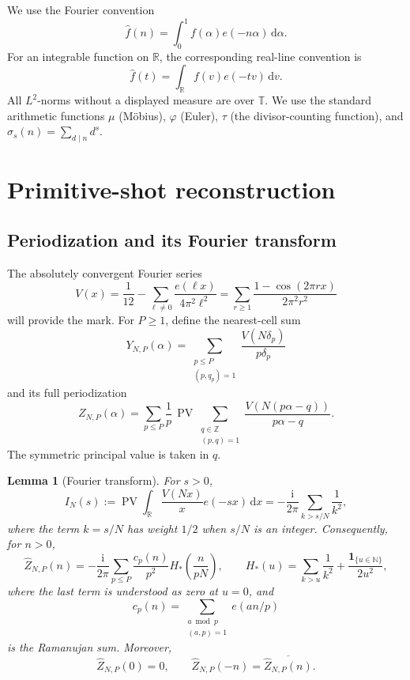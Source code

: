 \documentclass[11pt]{article}
\numberwithin{equation}{section}
\newtheorem{lemma}[theorem]{Lemma}
\theoremstyle{definition}
\newcommand{\T}{\mathbb T}
\newcommand{\R}{\mathbb R}
\newcommand{\Z}{\mathbb Z}
\newcommand{\N}{\mathbb N}
\newcommand{\1}{\mathbf 1}
\newcommand{\ii}{\mathrm i}
\newcommand{\dd}{\,\mathrm d}
\newcommand{\PV}{\operatorname{PV}}
\newcommand{\wh}{\widehat}
\begin{document}
We use the Fourier convention
\[
 \wh f(n)=\int_0^1 f(\alpha)e(-n\alpha)\dd\alpha.
\]
For an integrable function on \(\R\), the corresponding real-line
convention is
\[
 \wh f(t)=\int_{\R}f(v)e(-tv)\dd v.
\]
All \(L^2\)-norms without a displayed measure are over \(\T\).
We use the standard arithmetic functions \(\mu\) (Möbius), \(\varphi\)
(Euler), \(\tau\) (the divisor-counting function), and
\(\sigma_s(n)=\sum_{d\mid n}d^s\).

\section{Primitive-shot reconstruction}\label{sec:reconstruction}

\subsection{Periodization and its Fourier transform}

The absolutely convergent Fourier series
\begin{equation}\label{eq:Vfourier}
 V(x)=\frac1{12}-\sum_{\ell\ne0}
 \frac{e(\ell x)}{4\pi^2\ell^2}
 =\sum_{r\ge1}\frac{1-\cos(2\pi r x)}{2\pi^2r^2}
\end{equation}
will provide the mark.  For \(P\ge1\), define the nearest-cell sum
\[
 Y_{N,P}(\alpha)=
 \sum_{\substack{p\le P\\(p,q_p)=1}}
 \frac{V(N\delta_p)}{p\delta_p}
\]
and its full periodization
\begin{equation}\label{eq:defZ}
 Z_{N,P}(\alpha)=
 \sum_{p\le P}\frac1p\,
 \PV\sum_{\substack{q\in\Z\\(p,q)=1}}
 \frac{V(N(p\alpha-q))}{p\alpha-q}.
\end{equation}
The symmetric principal value is taken in \(q\).

\begin{lemma}[Fourier transform]\label{lem:transform}
For \(s>0\),
\begin{equation}\label{eq:Iinfty}
 I_N(s):=\PV\int_{\R}\frac{V(Nx)}x e(-sx)\dd x
 =-\frac{\ii}{2\pi}\sum_{k>s/N}\frac1{k^2},
\end{equation}
where the term \(k=s/N\) has weight \(1/2\) when \(s/N\) is an
integer.  Consequently, for \(n>0\),
\begin{equation}\label{eq:Zcoeff}
 \wh Z_{N,P}(n)=
 -\frac{\ii}{2\pi}
 \sum_{p\le P}\frac{c_p(n)}{p^2}
 H_*\left(\frac{n}{pN}\right),
 \qquad
 H_*(u)=\sum_{k>u}\frac1{k^2}
 +\frac{\1_{\{u\in\N\}}}{2u^2},
\end{equation}
where the last term is understood as zero at \(u=0\), and
\[
 c_p(n)=\sum_{\substack{a\bmod p\\(a,p)=1}}e(an/p)
\]
is the Ramanujan sum.
Moreover,
\[
 \widehat Z_{N,P}(0)=0,\qquad
 \widehat Z_{N,P}(-n)=\overline{\widehat Z_{N,P}(n)}.
\]
\end{lemma}
\end{document}
